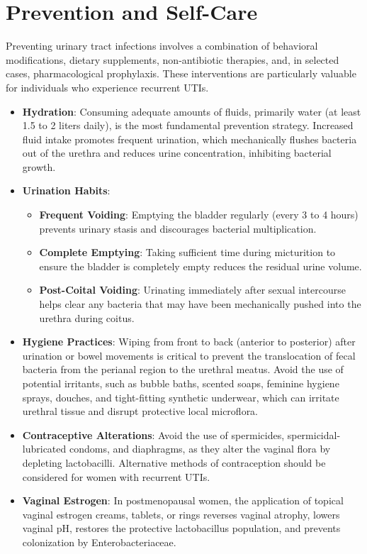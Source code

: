 \section*{Prevention and Self-Care}
Preventing urinary tract infections involves a combination of behavioral modifications, dietary supplements, non-antibiotic therapies, and, in selected cases, pharmacological prophylaxis. These interventions are particularly valuable for individuals who experience recurrent UTIs.

\begin{itemize}
    \item \textbf{Hydration}: Consuming adequate amounts of fluids, primarily water (at least 1.5 to 2 liters daily), is the most fundamental prevention strategy. Increased fluid intake promotes frequent urination, which mechanically flushes bacteria out of the urethra and reduces urine concentration, inhibiting bacterial growth.
    \item \textbf{Urination Habits}:
    \begin{itemize}
        \item \textbf{Frequent Voiding}: Emptying the bladder regularly (every 3 to 4 hours) prevents urinary stasis and discourages bacterial multiplication.
        \item \textbf{Complete Emptying}: Taking sufficient time during micturition to ensure the bladder is completely empty reduces the residual urine volume.
        \item \textbf{Post-Coital Voiding}: Urinating immediately after sexual intercourse helps clear any bacteria that may have been mechanically pushed into the urethra during coitus.
    \end{itemize}
    \item \textbf{Hygiene Practices}: Wiping from front to back (anterior to posterior) after urination or bowel movements is critical to prevent the translocation of fecal bacteria from the perianal region to the urethral meatus. Avoid the use of potential irritants, such as bubble baths, scented soaps, feminine hygiene sprays, douches, and tight-fitting synthetic underwear, which can irritate urethral tissue and disrupt protective local microflora.
    \item \textbf{Contraceptive Alterations}: Avoid the use of spermicides, spermicidal-lubricated condoms, and diaphragms, as they alter the vaginal flora by depleting lactobacilli. Alternative methods of contraception should be considered for women with recurrent UTIs.
    \item \textbf{Vaginal Estrogen}: In postmenopausal women, the application of topical vaginal estrogen creams, tablets, or rings reverses vaginal atrophy, lowers vaginal pH, restores the protective lactobacillus population, and prevents colonization by Enterobacteriaceae.

\end{itemize}
